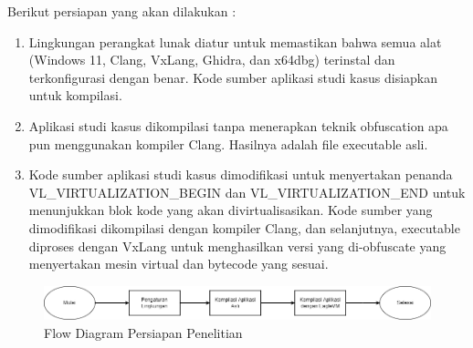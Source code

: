 Berikut persiapan yang akan dilakukan :
\begin{enumerate}
	\item {} Lingkungan perangkat lunak diatur untuk memastikan bahwa semua alat (Windows 11, Clang, VxLang, Ghidra, dan x64dbg) terinstal dan terkonfigurasi dengan benar. Kode sumber aplikasi studi kasus disiapkan untuk kompilasi.
	\item {} Aplikasi studi kasus dikompilasi tanpa menerapkan teknik obfuscation apa pun menggunakan kompiler Clang. Hasilnya adalah file executable asli.
	\item {} Kode sumber aplikasi studi kasus dimodifikasi untuk menyertakan penanda VL\_VIRTUALIZATION\_BEGIN dan VL\_VIRTUALIZATION\_END untuk menunjukkan blok kode yang akan divirtualisasikan. Kode sumber yang dimodifikasi dikompilasi dengan kompiler Clang, dan selanjutnya, executable diproses dengan VxLang untuk menghasilkan versi yang di-obfuscate yang menyertakan mesin virtual dan bytecode yang sesuai.
\end{enumerate}

\begin{figure}
	\centering
	\includegraphics[width=1\textwidth]
	{assets/pics/Persiapan.png}
	\caption{Flow Diagram Persiapan Penelitian}
\end{figure}


